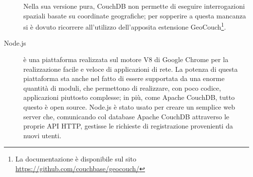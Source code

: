 \begin{description}
                Nella sua versione pura, CouchDB non permette di eseguire interrogazioni
                spaziali basate su coordinate geografiche; per sopperire a questa
                mancanza si è dovuto ricorrere all'utilizzo dell'apposita estensione
                GeoCouch\footnote{La documentazione
                è disponibile sul sito \url{https://github.com/couchbase/geocouch/}}.
            \item[Node.js] è una piattaforma realizzata sul motore \js{} V8 di
                Google Chrome per la realizzazione facile e veloce di
                applicazioni di rete. La potenza di questa piattaforma sta anche
                nel fatto di essere supportata da una enorme quantità di moduli,
                che permettono di realizzare, con poco codice, applicazioni piuttosto
                complesse; in più, come Apache CouchDB\texttrademark{}, tutto
                questo è open source. Node.js è stato usato per creare un
                semplice web server che, comunicando col database Apache CouchDB\texttrademark{}
                attraverso le proprie API HTTP, gestisse le richieste di
                registrazione provenienti da nuovi utenti.
        \end{description}

